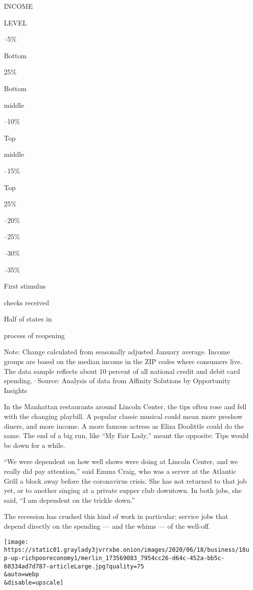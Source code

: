 INCOME

LEVEL

--5\%

Bottom

25\%

Bottom

middle

--10\%

Top

middle

--15\%

Top

25\%

--20\%

--25\%

--30\%

--35\%

First stimulus

checks received

Half of states in

process of reopening

Note: Change calculated from seasonally adjusted January average. Income
groups are based on the median income in the ZIP codes where consumers
live. The data sample reflects about 10 percent of all national credit
and debit card spending.·Source: Analysis of data from Affinity
Solutions by Opportunity Insights

In the Manhattan restaurants around Lincoln Center, the tips often rose
and fell with the changing playbill. A popular classic musical could
mean more preshow diners, and more income. A more famous actress as
Eliza Doolittle could do the same. The end of a big run, like ``My Fair
Lady,'' meant the opposite: Tips would be down for a while.

``We were dependent on how well shows were doing at Lincoln Center, and
we really did pay attention,'' said Emma Craig, who was a server at the
Atlantic Grill a block away before the coronavirus crisis. She has not
returned to that job yet, or to another singing at a private supper club
downtown. In both jobs, she said, ``I am dependent on the trickle
down.''

The recession has crushed this kind of work in particular: service jobs
that depend directly on the spending --- and the whims --- of the
well-off.

\texttt{[image: https://static01.graylady3jvrrxbe.onion/images/2020/06/18/business/18up-up-richpooreconomy1/merlin\_173569083\_7954cc26-d64c-452a-bb5c-60334ad7d787-articleLarge.jpg?quality=75\\\&auto=webp\\\&disable=upscale]}

